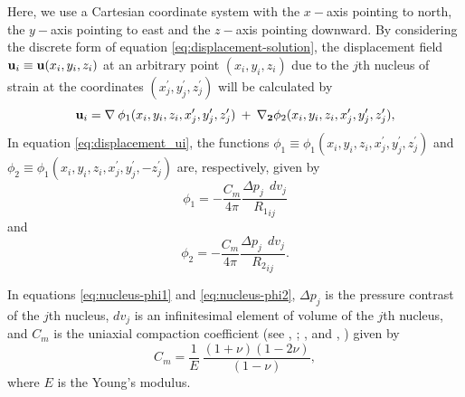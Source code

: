 \documentclass[journal abbreviation, manuscript]{copernicus}
\begin{document}
Here, we use a Cartesian coordinate system with the $x-$axis pointing to north, the $y-$axis pointing to east and the $z-$axis pointing downward.
By considering the discrete form of equation \ref{eq:displacement-solution}, the displacement field  $ {\bf{u}}_{i} \equiv  {\bf{u}}(x_{i}, y_{i}, z_{i})$ at an arbitrary point $(x_{i}, y_{i}, z_{i})$ due to the $j$th nucleus of strain at the coordinates 
$(x^{\prime}_{j}, y^{\prime}_{j}, z^{\prime}_{j})$ will be calculated by
\begin{equation}
{\bf{u}}_{i}  = {\bf{\nabla}} \: 
{\phi_{1}(x_{i}, y_{i}, z_{i}, x^{\prime}_{j}, y^{\prime}_{j}, z^{\prime}_{j})} \: + \: {\bf{{\nabla}_{2}}} {\phi_{2}(x_{i}, y_{i}, z_{i}, x^{\prime}_{j}, y^{\prime}_{j}, z^{\prime}_{j})}, 
\label{eq:displacement_ui}
\end{equation}
In equation \ref{eq:displacement_ui}, the functions 
$\phi_{1} \equiv {\phi_{1}(x_{i}, y_{i}, z_{i}, x^{\prime}_{j}, y^{\prime}_{j}, z^{\prime}_{j})}$ and  
$\phi_{2} \equiv {\phi_{1}(x_{i}, y_{i}, z_{i}, x^{\prime}_{j}, y^{\prime}_{j}, -z^{\prime}_{j})}$
are, respectively, given by 
\begin{equation}
\phi_{1} = - \frac{C_m}{4 \pi}  \frac{\Delta p_{j} \: \:dv_j}{ {R_1}_{ij} }
\label{eq:nucleus-phi1}
\end{equation}
and
\begin{equation}
\phi_{2} = - \frac{C_m}{4 \pi}  \frac{\Delta p_{j} \: \:dv_j}{ {R_2}_{ij} }.
\label{eq:nucleus-phi2}
\end{equation}

In equations \ref{eq:nucleus-phi1} and \ref{eq:nucleus-phi2}, $\Delta p_j$  is the pressure contrast of the $j$th nucleus, $dv_j$ is an infinitesimal element of volume of the $j$th nucleus, and $C_m$ is the uniaxial compaction coefficient (see \citeauthor{Geertsma66}, \citeyear{Geertsma66}; \citeauthor{Tempone10}, \citeyear{Tempone10} and \citeauthor{Munoz&Roehl17}, \citeyear{Munoz&Roehl17}) given by
\begin{equation}
C_m = \frac{1}{E} \: \frac{(1 + \nu) (1  - 2\nu)}{(1-\nu)},
\label{eq:Cm}
\end{equation}
where $E$ is the Young’s modulus.
\end{document}
